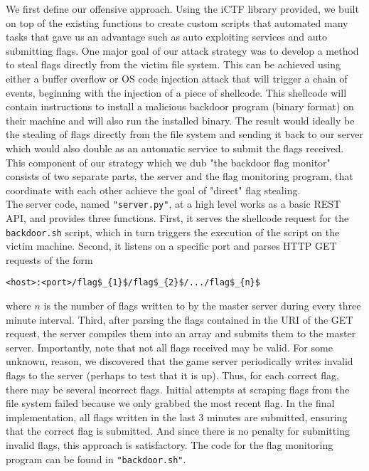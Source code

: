 \documentclass[12pt]{report}
\begin{document}
\noindent We first define our offensive approach. Using the iCTF library provided, we built on top of the existing functions to create custom scripts that automated many tasks that gave us an advantage such as auto exploiting services and auto submitting flags. One major goal of our attack strategy was to develop a method to steal flags directly from the victim file system. This can be achieved using either a buffer overflow or OS code injection attack that will trigger a chain of events, beginning with the injection of a piece of shellcode. This shellcode will contain instructions to install a malicious backdoor program (binary format) on their machine and will also run the installed binary. The result would ideally be the stealing of flags directly from the file system and sending it back to our server which would also double as an automatic service to submit the flags received. This component of our strategy which we dub "the backdoor flag monitor" consists of two separate parts, the server and the flag monitoring program, that coordinate with each other achieve the goal of "direct" flag stealing. \\

\noindent The server code, named \texttt{"server.py"}, at a high level works as a basic REST API, and provides three functions. First, it serves the shellcode request for the \texttt{backdoor.sh} script, which in turn triggers the execution of the script on the victim machine. Second, it listens on a specific port and parses HTTP GET requests of the form

\begin{lstlisting}[mathescape]
    <host>:<port>/flag$_{1}$/flag$_{2}$/.../flag$_{n}$
\end{lstlisting}

\noindent where $n$ is the number of flags written to by the master server during every three minute interval. Third, after parsing the flags contained in the URI of the GET request, the server compiles them into an array and submits them to the master server. Importantly, note that not all flags received may be valid. For some unknown, reason, we discovered that the game server periodically writes invalid flags to the server (perhaps to test that it is up). Thus, for each correct flag, there may be several incorrect flags. Initial attempts at scraping flags from the file system failed because we only grabbed the most recent flag. In the final implementation, all flags written in the last 3 minutes are submitted, ensuring that the correct flag is submitted. And since there is no penalty for submitting invalid flags, this approach is satisfactory. The code for the flag monitoring program can be found in \texttt{"backdoor.sh"}.\\
\end{document}
